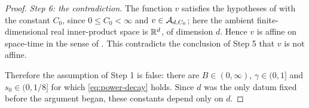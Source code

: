 \begin{proof}
\emph{Step 6: the contradiction.}
The function $v$ satisfies the hypotheses of  with the
constant $C_0$, since $0\le C_0<\infty$ and $v\in\mathcal{A}_{d,C_0}$; here the
ambient finite-dimensional real inner-product space is $\mathbb{R}^d$, of dimension $d$.
Hence $v$ is affine on space-time in the sense of .
This contradicts the conclusion of Step 5 that $v$ is not affine.

Therefore the assumption of Step 1 is false: there are $B\in(0,\infty)$,
$\gamma\in(0,1]$ and $s_0\in(0,1/8]$ for which \eqref{eq:power-decay} holds.
Since $d$ was the only datum fixed before the argument began, these constants
depend only on $d$.
\end{proof}
